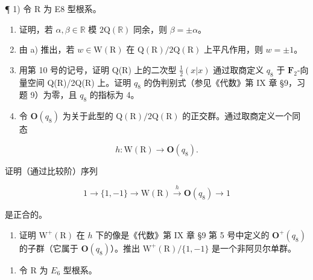 ¶ 1) 令 R 为 E8 型根系。

\begin{enumerate}
\def\labelenumi{\alph{enumi})}
\item
  证明，若 \(\alpha, \beta \in \mathbb{R}\) 模 \(2\mathrm{Q}(\mathbb{R})\) 同余，则 \(\beta = \pm \alpha\)。
\item
  由 a) 推出，若 \(w \in \mathrm{W}(\mathrm{R})\) 在 \(\mathrm{Q}(\mathrm{R}) / 2\mathrm{Q}(\mathrm{R})\) 上平凡作用，则 \(w = \pm 1\)。
\item
  用第 10 号的记号，证明 Q(R) 上的二次型 \(\frac{1}{2}(x|x)\) 通过取商定义 \(q_{8}\) 于 \(\mathbf{F}_2\)-向量空间 Q(R)/2Q(R) 上。证明 \(q_{8}\) 的伪判别式（参见《代数》第 IX 章 §9，习题 9）为零，且 \(q_{8}\) 的指标为 4。
\item
  令 \(\mathbf{O}(q_{8})\) 为关于此型的 \(\mathrm{Q}(\mathrm{R})/2\mathrm{Q}(\mathrm{R})\) 的正交群。通过取商定义一个同态
\end{enumerate}

\[
h: \mathrm{W} (\mathrm{R}) \rightarrow \mathbf {O} (q _ {8}).
\]

证明（通过比较阶）序列

\[
1 \rightarrow \{1, - 1 \} \rightarrow \mathrm{W(R)} \stackrel {h} {\longrightarrow} \mathbf {O} (q _ {8}) \rightarrow 1
\]

是正合的。

\begin{enumerate}
\def\labelenumi{\alph{enumi})}
\setcounter{enumi}{4}
\tightlist
\item
  证明 \(\mathrm{W}^{+}(\mathrm{R})\) 在 \(h\) 下的像是《代数》第 IX 章 §9 第 5 号中定义的 \(\mathbf{O}^{+}(q_{8})\) 的子群（它属于 \(\mathbf{O}(q_8)\)）。推出 \(\mathrm{W}^{+}(\mathrm{R}) / \{1, -1\}\) 是一个非阿贝尔单群。
\end{enumerate}

\begin{enumerate}
\def\labelenumi{\arabic{enumi})}
\setcounter{enumi}{1}
\tightlist
\item
  令 R 为 \(E_{6}\) 型根系。
\end{enumerate}

